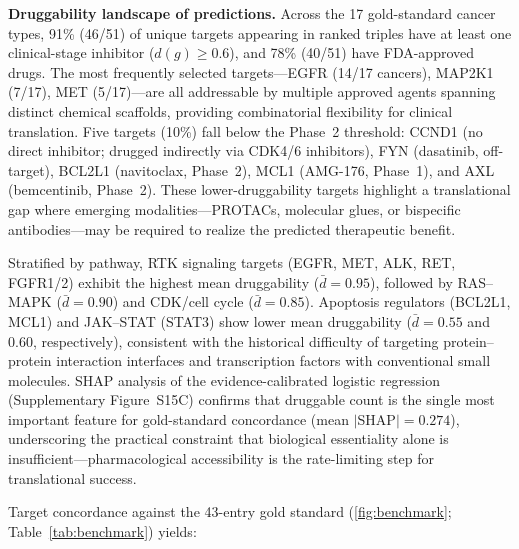 \documentclass[times, twoside, watermark]{zHenriquesLab-StyleBioRxiv}
\begin{document}
\textbf{Druggability landscape of predictions.}
Across the 17 gold-standard cancer types, 91\% (46/51) of unique targets appearing in ranked triples have at least one clinical-stage inhibitor ($d(g) \geq 0.6$), and 78\% (40/51) have FDA-approved drugs. The most frequently selected targets---EGFR (14/17 cancers), MAP2K1 (7/17), MET (5/17)---are all addressable by multiple approved agents spanning distinct chemical scaffolds, providing combinatorial flexibility for clinical translation. Five targets (10\%) fall below the Phase~2 threshold: CCND1 (no direct inhibitor; drugged indirectly via CDK4/6 inhibitors), FYN (dasatinib, off-target), BCL2L1 (navitoclax, Phase~2), MCL1 (AMG-176, Phase~1), and AXL (bemcentinib, Phase~2). These lower-druggability targets highlight a translational gap where emerging modalities---PROTACs, molecular glues, or bispecific antibodies---may be required to realize the predicted therapeutic benefit.

Stratified by pathway, RTK signaling targets (EGFR, MET, ALK, RET, FGFR1/2) exhibit the highest mean druggability ($\bar{d} = 0.95$), followed by RAS--MAPK ($\bar{d} = 0.90$) and CDK/cell cycle ($\bar{d} = 0.85$). Apoptosis regulators (BCL2L1, MCL1) and JAK--STAT (STAT3) show lower mean druggability ($\bar{d} = 0.55$ and $0.60$, respectively), consistent with the historical difficulty of targeting protein--protein interaction interfaces and transcription factors with conventional small molecules. SHAP analysis of the evidence-calibrated logistic regression (Supplementary Figure~S15C) confirms that druggable count is the single most important feature for gold-standard concordance (mean $|$SHAP$| = 0.274$), underscoring the practical constraint that biological essentiality alone is insufficient---pharmacological accessibility is the rate-limiting step for translational success.

Target concordance against the 43-entry gold standard (\cref{fig:benchmark}; Table~\ref{tab:benchmark}) yields:
\end{document}
